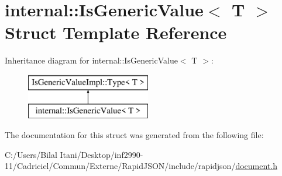 \hypertarget{structinternal_1_1_is_generic_value}{}\section{internal\+:\+:Is\+Generic\+Value$<$ T $>$ Struct Template Reference}
\label{structinternal_1_1_is_generic_value}
Inheritance diagram for internal\+:\+:Is\+Generic\+Value$<$ T $>$\+:\begin{figure}[H]
\begin{center}
\leavevmode
\includegraphics[height=2.000000cm]{structinternal_1_1_is_generic_value}
\end{center}
\end{figure}


The documentation for this struct was generated from the following file\+:\begin{DoxyCompactItemize}
\item 
C\+:/\+Users/\+Bilal Itani/\+Desktop/inf2990-\/11/\+Cadriciel/\+Commun/\+Externe/\+Rapid\+J\+S\+O\+N/include/rapidjson/\hyperlink{document_8h}{document.\+h}\end{DoxyCompactItemize}
